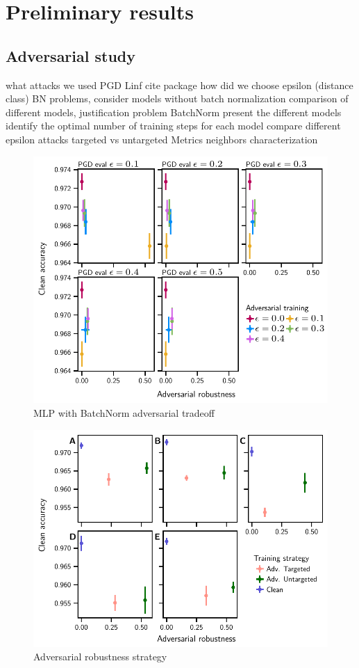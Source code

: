 \documentclass[../main.tex]{subfiles}
\begin{document}
\section{Preliminary results}
	\subsection{Adversarial study}
		what attacks we used PGD Linf cite package
		how did we choose epsilon (distance class)
		BN problems, consider models without batch normalization
		comparison of different models, justification problem BatchNorm
		present the different models
		identify the optimal number of training steps for each model
		compare different epsilon attacks
		targeted vs untargeted
		Metrics
		neighbors characterization
		\begin{figure}[htbp]
			\centering
			\includegraphics{MLP_BN_adversarial_tradeoff.pdf}
			\caption{MLP with BatchNorm adversarial tradeoff}\label{fig:mlp_bn_adv_tradeoff}
		\end{figure}

		\begin{figure}[htbp]
			\centering
			\includegraphics{adversarial_robustness_strategy.pdf}
			\caption{Adversarial robustness strategy}\label{fig:adv_robust_strat}
		\end{figure}
\end{document}
